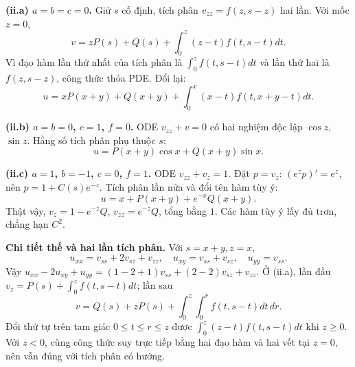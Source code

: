 \documentclass[10pt,a4paper]{article}
\begin{document}
\textbf{(ii.a) $a=b=c=0$.} Giữ $s$ cố định, tích phân $v_{zz}=f(z,s-z)$ hai lần. Với mốc $z=0$,
\[v=zP(s)+Q(s)+\int_0^z(z-t)f(t,s-t)dt.\]
Vì đạo hàm lần thứ nhất của tích phân là $\int_0^z f(t,s-t)dt$ và lần thứ hai là $f(z,s-z)$, công thức thỏa PDE. Đổi lại:
\[u=xP(x+y)+Q(x+y)+\int_0^x(x-t)f(t,x+y-t)dt.\]

\textbf{(ii.b) $a=b=0$, $c=1$, $f=0$.} ODE $v_{zz}+v=0$ có hai nghiệm độc lập $\cos z$, $\sin z$. Hằng số tích phân phụ thuộc $s$:
\[\boxed{u=P(x+y)\cos x+Q(x+y)\sin x.}\]

\textbf{(ii.c) $a=1$, $b=-1$, $c=0$, $f=1$.} ODE $v_{zz}+v_z=1$. Đặt $p=v_z$: $(e^zp)'=e^z$, nên $p=1+C(s)e^{-z}$. Tích phân lần nữa và đổi tên hàm tùy ý:
\[\boxed{u=x+P(x+y)+e^{-x}Q(x+y).}\]
Thật vậy, $v_z=1-e^{-z}Q$, $v_{zz}=e^{-z}Q$, tổng bằng $1$. Các hàm tùy ý lấy đủ trơn, chẳng hạn $C^2$.

\textbf{Chi tiết thế và hai lần tích phân.} Với $s=x+y,z=x$,
\[u_{xx}=v_{ss}+2v_{sz}+v_{zz},\quad u_{xy}=v_{ss}+v_{sz},\quad u_{yy}=v_{ss}.\]
Vậy $u_{xx}-2u_{xy}+u_{yy}=(1-2+1)v_{ss}+(2-2)v_{sz}+v_{zz}$. Ở (ii.a), lần đầu $v_z=P(s)+\int_0^zf(t,s-t)dt$; lần sau
\[v=Q(s)+zP(s)+\int_0^z\int_0^r f(t,s-t)dt\,dr.\]
Đổi thứ tự trên tam giác $0\le t\le r\le z$ được $\int_0^z(z-t)f(t,s-t)dt$ khi $z\ge0$. Với $z<0$, cùng công thức suy trực tiếp bằng hai đạo hàm và hai vết tại $z=0$, nên vẫn đúng với tích phân có hướng.
\end{document}

